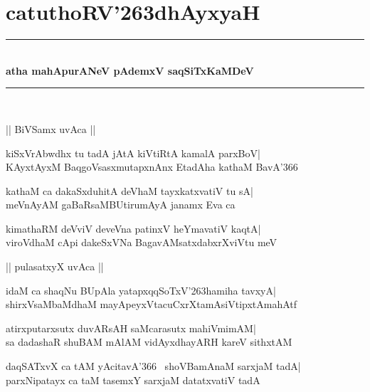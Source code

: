 \documentclass[twoside,12pt,openright]{book}
\def\S{\char'263}
\newcounter{shloka}[chapter]
\begin{document}
\chapter{catuthoRV\S dhAyxyaH}
\begin{center}
\rule{2cm}{1pt}\\[0.5cm]
{\LARGE\bfseries atha mahApurANeV pAdemxV saqSiTxKaMDeV}\\[.3cm]
\rule{2cm}{1pt}\\
\end{center}

\begin{center}
|| BiVSamx uvAca ||
\end{center}
\begin{shloka}%
kiSxVrAbwdhx tu tadA jAtA kiVtiRtA kamalA parxBoV|\\
KAyxtAyxM BaqgoVsasxmutapxnAnx EtadAha kathaM BavA\char'366
\end{shloka}

\begin{shloka}%
kathaM ca dakaSxduhitA deVhaM tayxkatxvatiV tu sA|\\
meVnAyAM gaBaRsaMBUtirumAyA janamx Eva ca
\end{shloka}

\begin{shloka}%
kimathaRM deVviV deveVna patinxV heYmavatiV kaqtA|\\
viroVdhaM cApi dakeSxVNa BagavAMsatxdabxrXviVtu meV
\end{shloka}

\begin{center}
|| pulasatxyX uvAca ||
\end{center}
\begin{shloka}%
idaM ca shaqNu BUpAla yatapxqqSoTxV\S hamiha tavxyA|\\
shirxVsaMbaMdhaM mayApeyxVtacuCxrXtamAsiVtipxtAmahAtf
\end{shloka}

\begin{shloka}%
atirxputarxsutx duvARsAH saMcarasutx mahiVmimAM|\\
sa dadashaR shuBAM mAlAM vidAyxdhayARH kareV sithxtAM
\end{shloka}

\begin{shloka}%
daqSATxvX ca tAM yAcitavA\char'366~ shoVBamAnaM sarxjaM tadA|\\
parxNipatayx ca taM tasemxY sarxjaM datatxvatiV tadA
\end{shloka}
\end{document}
